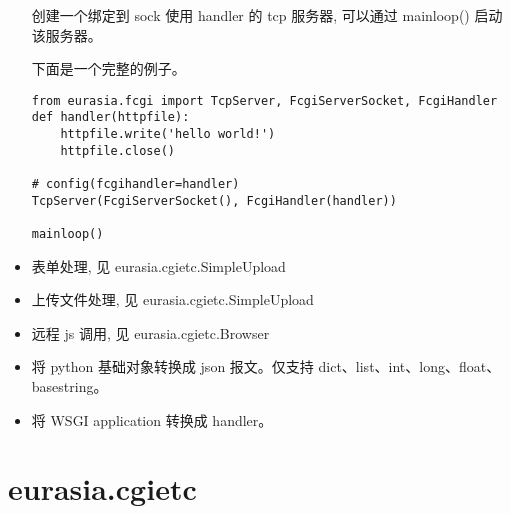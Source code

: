 \documentclass{manual}
\begin{document}
\begin{itemize}
创建一个绑定到 sock 使用 handler 的 tcp 服务器, 可以通过 mainloop() 启动该服务器。

下面是一个完整的例子。

\begin{verbatim}
from eurasia.fcgi import TcpServer, FcgiServerSocket, FcgiHandler
def handler(httpfile):
	httpfile.write('hello world!')
	httpfile.close()

# config(fcgihandler=handler)
TcpServer(FcgiServerSocket(), FcgiHandler(handler))

mainloop()
\end{verbatim}

\item {}

表单处理, 见 eurasia.cgietc.SimpleUpload

\item {}

上传文件处理, 见 eurasia.cgietc.SimpleUpload

\item {}

远程 js 调用, 见 eurasia.cgietc.Browser

\item {}

将 python 基础对象转换成 json 报文。仅支持 dict、list、int、long、float、basestring。


\item {}

将 WSGI application 转换成 handler。

\end{itemize}

\section{eurasia.cgietc}
\end{document}

